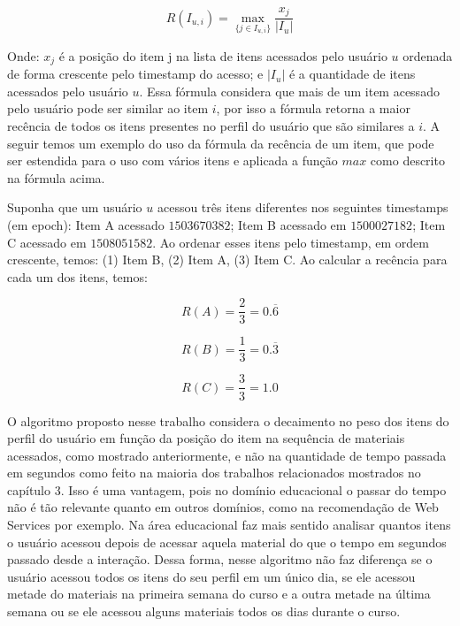 \begin{equation}
  R(I_{u,i}) = \max_{\{j \in I_{u,i}\}}{\frac{x_j}{\left| I_u \right|}}
  \label{eq:recencia-proposta}
\end{equation}

Onde: $x_j$ é a posição do item j na lista de itens acessados pelo usuário $u$ ordenada de forma crescente pelo
timestamp do acesso; e $\left| I_u \right|$ é a quantidade de itens acessados pelo usuário $u$. Essa fórmula considera
que mais de um item acessado pelo usuário pode ser similar ao item $i$, por isso a fórmula retorna a maior recência de
todos os itens presentes no perfil do usuário que são similares a $i$. A seguir temos um exemplo do uso da fórmula da
recência de um item, que pode ser estendida para o uso com vários itens e aplicada a função $max$ como descrito na
fórmula acima.

Suponha que um usuário $u$ acessou três itens diferentes nos seguintes timestamps (em epoch): Item A acessado $1503670382$;
Item B acessado em $1500027182$; Item C acessado em $1508051582$. Ao ordenar esses itens pelo timestamp, em ordem
crescente, temos: (1) Item B, (2) Item A, (3) Item C. Ao calcular a recência para cada um dos itens, temos:

\begin{equation}
  R(A) = \frac{2}{3} = 0.\overline{6}
  \label{eq:recencia-item-a}
\end{equation}

\begin{equation}
  R(B) = \frac{1}{3} = 0.\overline{3}
  \label{eq:recencia-item-b}
\end{equation}

\begin{equation}
  R(C) = \frac{3}{3} = 1.0
  \label{eq:recencia-item-c}
\end{equation}

O algoritmo proposto nesse trabalho considera o decaimento no peso dos itens do perfil do usuário em função da posição
do item na sequência de materiais acessados, como mostrado anteriormente, e não na quantidade de tempo passada em
segundos como feito na maioria dos trabalhos relacionados mostrados no capítulo 3. Isso é uma vantagem, pois no domínio
educacional o passar do tempo não é tão relevante quanto em outros domínios, como na recomendação de Web Services por
exemplo. Na área educacional faz mais sentido analisar quantos itens o usuário acessou depois de acessar aquela material
do que o tempo em segundos passado desde a interação. Dessa forma, nesse algoritmo não faz diferença se o usuário
acessou todos os itens do seu perfil em um único dia, se ele acessou metade do materiais na primeira semana do curso e
a outra metade na última semana ou se ele acessou alguns materiais todos os dias durante o curso.

